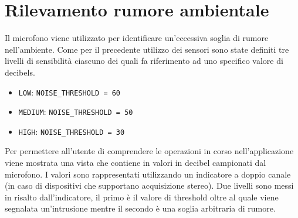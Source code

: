 \section{Rilevamento rumore ambientale}
Il microfono viene utilizzato per identificare un'eccessiva soglia di rumore nell'ambiente. Come per il precedente utilizzo dei sensori sono state definiti tre livelli di sensibilità ciascuno dei quali fa riferimento ad uno specifico valore di decibels.

\begin{itemize}
	\item \texttt{LOW}: \texttt{NOISE\_THRESHOLD = 60}
	\item \texttt{MEDIUM}:  \texttt{NOISE\_THRESHOLD = 50}
	\item \texttt{HIGH}:  \texttt{NOISE\_THRESHOLD = 30}
\end{itemize}

Per permettere all'utente di comprendere le operazioni in corso nell'applicazione viene mostrata una vista che contiene in valori in decibel campionati dal microfono. I valori sono rappresentati utilizzando un indicatore a doppio canale (in caso di dispositivi che supportano acquisizione stereo). Due livelli sono messi in risalto dall'indicatore, il primo è il valore di threshold oltre al quale viene segnalata un'intrusione mentre il secondo è una soglia arbitraria di rumore.


